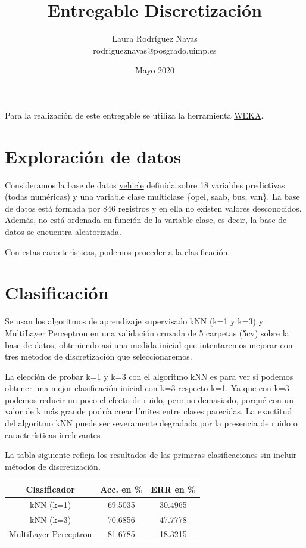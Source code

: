 \documentclass{article}
\title{Entregable Discretización}
\author{Laura Rodríguez Navas \\ rodrigueznavas@posgrado.uimp.es}
\date{Mayo 2020}
\begin{document}
	
\maketitle

Para la realización de este entregable se utiliza la herramienta \href{https://www.cs.waikato.ac.nz/ml/weka/}{WEKA}.

\section*{Exploración de datos}

Consideramos la base de datos \href{https://archive.ics.uci.edu/ml/datasets/Statlog+(Vehicle+Silhouettes)}{vehicle} definida sobre 18 variables predictivas (todas numéricas) y una variable clase multiclase \{opel, saab, bus, van\}. La base de datos está formada por 846 registros y en ella no existen valores desconocidos. Además, no está ordenada en función de la variable clase, es decir, la base de datos se encuentra aleatorizada. 

Con estas características, podemos proceder a la clasificación.

\section*{Clasificación}

Se usan los algoritmos de aprendizaje supervisado kNN (k=1 y k=3) y MultiLayer Perceptron en una validación cruzada de 5 carpetas (5cv) sobre la base de datos, obteniendo así una medida inicial que intentaremos mejorar con tres métodos de discretización que seleccionaremos. 

La elección de probar k=1 y k=3 con el algoritmo kNN es para ver si podemos obtener una mejor clasificación inicial con k=3 respecto k=1. Ya que con k=3 podemos reducir un poco el efecto de ruido, pero no demasiado, porqué con un valor de k más grande podría crear límites entre clases parecidas. La exactitud del algoritmo kNN puede ser severamente degradada por la presencia de ruido o características irrelevantes

La tabla siguiente refleja los resultados de las primeras clasificaciones sin incluir métodos de discretización.

\begin{center}
	\begin{tabular}{ |c|c|c| } 
		\hline
		Clasificador & Acc. en \% & ERR en \% \\
		\hline
		kNN (k=1) & 69.5035 & 30.4965 \\ 
		kNN (k=3) & 70.6856 & 47.7778 \\ 
		MultiLayer Perceptron & 81.6785 & 18.3215 \\ 
		\hline
	\end{tabular}
\end{center}
\end{document}
